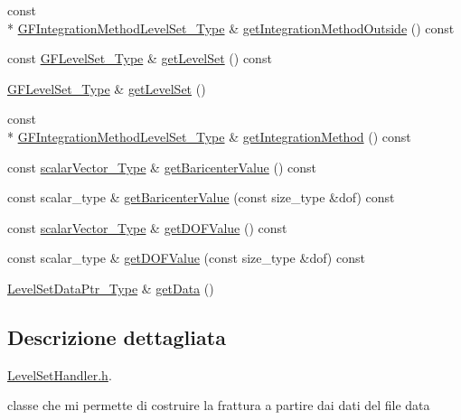 \begin{DoxyCompactItemize}
\item 
const \\*
\hyperlink{Core_8h_ade18ba6e17965b6fdd50b3382b2a7020}{G\-F\-Integration\-Method\-Level\-Set\-\_\-\-Type} \& \hyperlink{classLevelSetHandler_a155cedf651006dc5509c34a6ea5e3324}{get\-Integration\-Method\-Outside} () const 
\item 
const \hyperlink{Core_8h_a71358a15bd3925629e26ccbb214a0133}{G\-F\-Level\-Set\-\_\-\-Type} \& \hyperlink{classLevelSetHandler_aa899ffbee62631067378346d61fd172a}{get\-Level\-Set} () const 
\item 
\hyperlink{Core_8h_a71358a15bd3925629e26ccbb214a0133}{G\-F\-Level\-Set\-\_\-\-Type} \& \hyperlink{classLevelSetHandler_a88f16d61da1d2a2a68d5ef33fa77a41d}{get\-Level\-Set} ()
\item 
const \\*
\hyperlink{Core_8h_ade18ba6e17965b6fdd50b3382b2a7020}{G\-F\-Integration\-Method\-Level\-Set\-\_\-\-Type} \& \hyperlink{classLevelSetHandler_ad35aef3284c2582550b376fd3e99c45f}{get\-Integration\-Method} () const 
\item 
const \hyperlink{Core_8h_a4e75b5863535ba1dd79942de2846eff0}{scalar\-Vector\-\_\-\-Type} \& \hyperlink{classLevelSetHandler_a983463087a38199510a0859658ad5291}{get\-Baricenter\-Value} () const 
\item 
const scalar\-\_\-type \& \hyperlink{classLevelSetHandler_a7a4653958485195d2b995be4d52e2765}{get\-Baricenter\-Value} (const size\-\_\-type \&dof) const 
\item 
const \hyperlink{Core_8h_a4e75b5863535ba1dd79942de2846eff0}{scalar\-Vector\-\_\-\-Type} \& \hyperlink{classLevelSetHandler_ac46f075503657b1481d80acb5d3307d1}{get\-D\-O\-F\-Value} () const 
\item 
const scalar\-\_\-type \& \hyperlink{classLevelSetHandler_ab9babfc6e7705047b005a88b4ab1f46f}{get\-D\-O\-F\-Value} (const size\-\_\-type \&dof) const 
\item 
\hyperlink{LevelSetData_8h_a7750f14ec1c622b3c69aa0c5c2894972}{Level\-Set\-Data\-Ptr\-\_\-\-Type} \& \hyperlink{classLevelSetHandler_ab24897cb969210d278f54d94fd8f8977}{get\-Data} ()
\end{DoxyCompactItemize}


\subsection{Descrizione dettagliata}
\hyperlink{LevelSetHandler_8h}{Level\-Set\-Handler.\-h}. 

classe che mi permette di costruire la frattura a partire dai dati del file data 

